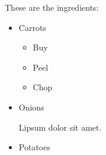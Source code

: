 \documentclass{article}
\begin{document}
These are the ingredients:
\begin{itemize}
    \item Carrots
    \begin{itemize}
        \item Buy
        \item Peel
        \item Chop
    \end{itemize}
    \item Onions
    
    Lipsum dolor sit amet.
    \item Potatoes
\end{itemize}
\end{document}

